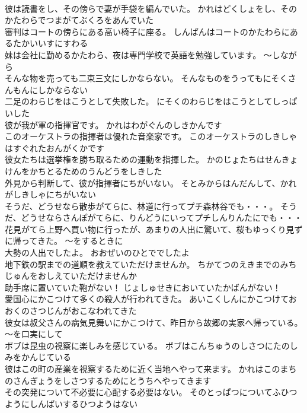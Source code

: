 \documentclass[8pt]{extreport}
\begin{document}
\begin{CJK}{UTF8}{min}
\\	彼は読書をし、その傍らで妻が手袋を編んでいた。	かれはどくしょをし、そのかたわらでつまがてぶくろをあんでいた 
\\	審判はコートの傍らにある高い椅子に座る。	しんぱんはコートのかたわらにあるたかいいすにすわる 
\\	妹は会社に勤めるかたわら、夜は専門学校で英語を勉強しています。	～しながら
\\	そんな物を売っても二束三文にしかならない。	そんなものをうってもにそくさんもんにしかならない 
\\	二足のわらじをはこうとして失敗した。	にそくのわらじをはこうとしてしっぱいした 
\\	彼が我が軍の指揮官です。	かれはわがぐんのしきかんです 
\\	このオーケストラの指揮者は優れた音楽家です。	このオーケストラのしきしゃはすぐれたおんがくかです 
\\	彼女たちは選挙権を勝ち取るための運動を指揮した。	かのじょたちはせんきょけんをかちとるためのうんどうをしきした 
\\	外見から判断して、彼が指揮者にちがいない。	そとみからはんだんして、かれがしきしゃにちがいない 
\\	そうだ、どうせなら散歩がてらに、林道に行ってプチ森林谷でも・・・。	そうだ、どうせならさんぽがてらに、りんどうにいってプチしんりんたにでも・・・ 
\\	花見がてら上野へ買い物に行ったが、あまりの人出に驚いて、桜もゆっくり見ずに帰ってきた。	～をするときに
\\	大勢の人出でしたよ。	おおぜいのひとででしたよ 
\\	地下鉄の駅までの道順を教えていただけませんか。	ちかてつのえきまでのみちじゅんをおしえていただけませんか 
\\	助手席に置いていた鞄がない！	じょしゅせきにおいていたかばんがない！ 
\\	愛国心にかこつけて多くの殺人が行われてきた。	あいこくしんにかこつけておおくのさつじんがおこなわれてきた 
\\	彼女は叔父さんの病気見舞いにかこつけて、昨日から故郷の実家へ帰っている。	～を口実にして
\\	ボブは昆虫の視察に楽しみを感じている。	ボブはこんちゅうのしさつにたのしみをかんじている 
\\	彼はこの町の産業を視察するために近く当地へやって来ます。	かれはこのまちのさんぎょうをしさつするためにとうちへやってきます 
\\	その突発について不必要に心配する必要はない。	そのとっぱつについてふひつようにしんぱいするひつようはない 

\end{CJK}
\end{document}
